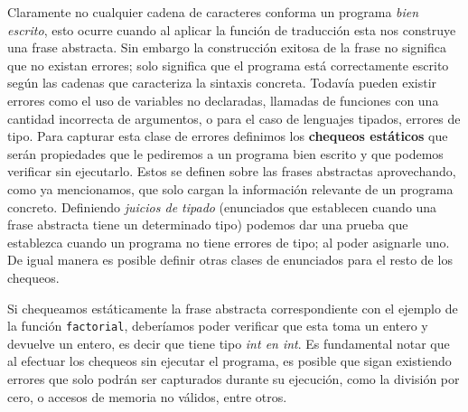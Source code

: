 Claramente no cualquier cadena de caracteres conforma un programa \textit{bien escrito}, esto ocurre cuando al aplicar la función de traducción esta nos construye una frase abstracta.
Sin embargo la construcción exitosa de la frase no significa que no existan errores; solo significa que el programa está correctamente escrito según las cadenas que caracteriza la sintaxis concreta.
Todavía pueden existir errores como el uso de variables no declaradas, llamadas de funciones con una cantidad incorrecta de argumentos, o para el caso de lenguajes tipados, errores de tipo.
Para capturar esta clase de errores definimos los \textbf{chequeos estáticos} que serán propiedades que le pediremos a un programa bien escrito y que podemos verificar sin ejecutarlo.
Estos se definen sobre las frases abstractas aprovechando, como ya mencionamos, que solo cargan la información relevante de un programa concreto.
Definiendo \textit{juicios de tipado} (enunciados que establecen cuando una frase abstracta tiene un determinado tipo) podemos dar una prueba que establezca cuando un programa no tiene errores de tipo; al poder asignarle uno. De igual manera es posible definir otras clases de enunciados para el resto de los chequeos.

Si chequeamos estáticamente la frase abstracta correspondiente con el ejemplo de la función \texttt{factorial}, deberíamos poder verificar que esta toma un entero y devuelve un entero, es decir que tiene tipo \textit{int en int}.
Es fundamental notar que al efectuar los chequeos sin ejecutar el programa, es posible que sigan existiendo errores que solo podrán ser capturados durante su ejecución, como la división por cero, o accesos de memoria no válidos, entre otros.

\iffalse
Supongamos que se analiza la función \texttt{factorial} declarada previamente.
Mediante una prueba, es posible demostrar la existencia del juicio de tipado que asegura que la función tiene tipo de \textit{enteros en enteros}.
A lo largo de la verificación del programa, se utilizará esta información para evitar cualquier llamada a la construcción que no respete su tipo.
\fi

